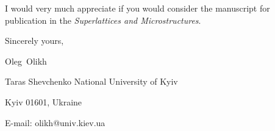 \documentclass[preprint]{elsarticle}
\begin{document}

I would  very much appreciate if you would consider the manuscript for publication in the \emph{Superlattices and Microstructures}.

\vspace{3mm}

Sincerely yours,

Oleg~Olikh


Taras Shevchenko National University of Kyiv


Kyiv 01601, Ukraine

E-mail: olikh@univ.kiev.ua


\end{document}
